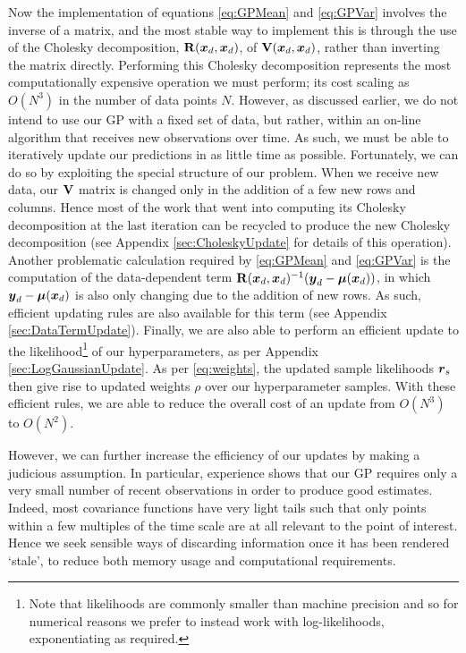 \documentclass{acmtrans2m}
\begin{document}
\noindent Now the implementation of equations \eqref{eq:GPMean} and \eqref{eq:GPVar} involves the inverse of a matrix, and the most stable way to implement this is through the use of the Cholesky decomposition, $\mathbf{R}(\boldsymbol{x}_d,\boldsymbol{x}_d)$, of $\mathbf{V}(\boldsymbol{x}_d,\boldsymbol{x}_d)$, rather than inverting the matrix directly. %
Performing this Cholesky decomposition represents the most computationally expensive operation we must perform; its cost scaling as $O(N^3)$ in the number of data points $N$. However, as discussed earlier, we do not intend to use our GP with a fixed set of data, but rather, within an on-line algorithm that receives new observations over time. As such, we must be able to iteratively update our predictions in as little time as possible. Fortunately, we can do so by exploiting the special structure of our problem. When we receive new data, our $\mathbf{V}$ matrix is changed only in the addition of a few new rows and columns. Hence most of the work that went into computing its Cholesky decomposition at the last iteration can be recycled to produce the new Cholesky decomposition (see Appendix \ref{sec:CholeskyUpdate} for details of this operation). Another problematic calculation required by \eqref{eq:GPMean} and \eqref{eq:GPVar} is the computation of the data-dependent term $\mathbf{R}(\boldsymbol{x}_d,\boldsymbol{x}_d)^{-1}(\boldsymbol{y}_d-\boldsymbol{\mu}(\boldsymbol{x}_d))$, in which $\boldsymbol{y}_d-\boldsymbol{\mu}(\boldsymbol{x}_d)$ is also only changing due to the addition of new rows. As such, efficient updating rules are also available for this term (see Appendix \ref{sec:DataTermUpdate}). Finally, we are also able to perform an efficient update to the likelihood\footnote{Note that likelihoods are commonly smaller than machine precision and so for numerical reasons we prefer to instead work with log-likelihoods, exponentiating as required.} of our hyperparameters, as per Appendix \ref{sec:LogGaussianUpdate}. As per \eqref{eq:weights}, the updated sample likelihoods $\boldsymbol{r}_s$ then give rise to updated weights $\rho$ over our hyperparameter samples. With these efficient rules, we are able to reduce the overall cost of an update from $O(N^3)$ to $O(N^2)$.

However, we can further increase the efficiency of our updates by making a judicious assumption. In particular, experience shows that our GP requires only a very small number of recent observations in order to produce good estimates. Indeed, most covariance functions have very light tails such that only points within a few multiples of the time scale are at all relevant to the point of interest. Hence we seek sensible ways of discarding information once it has been rendered `stale', to reduce both memory usage and computational requirements.
\end{document}
